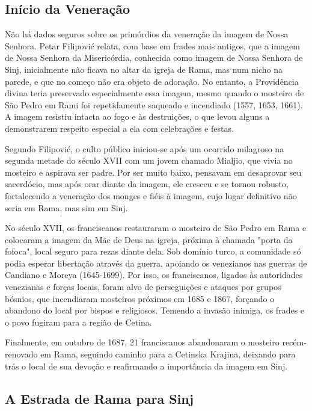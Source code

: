 \documentclass[a4paper,14pt]{extarticle} \usepackage[utf8]{inputenc}
\begin{document}
\subsection{Início da Veneração}

Não há dados seguros sobre os primórdios da veneração da imagem de Nossa Senhora. Petar Filipović relata, com base em frades mais antigos, que a imagem de Nossa Senhora da Misericórdia, conhecida como imagem de Nossa Senhora de Sinj, inicialmente não ficava no altar da igreja de Rama, mas num nicho na parede, e que no começo não era objeto de adoração. No entanto, a Providência divina teria preservado especialmente essa imagem, mesmo quando o mosteiro de São Pedro em Rami foi repetidamente saqueado e incendiado (1557, 1653, 1661). A imagem resistiu intacta ao fogo e às destruições, o que levou alguns a demonstrarem respeito especial a ela com celebrações e festas.

Segundo Filipović, o culto público iniciou-se após um ocorrido milagroso na segunda metade do século XVII com um jovem chamado Mialjio, que vivia no mosteiro e aspirava ser padre. Por ser muito baixo, pensavam em desaprovar seu sacerdócio, mas após orar diante da imagem, ele cresceu e se tornou robusto, fortalecendo a veneração dos monges e fiéis à imagem, cujo lugar definitivo não seria em Rama, mas sim em Sinj.

No século XVII, os franciscanos restauraram o mosteiro de São Pedro em Rama e colocaram a imagem da Mãe de Deus na igreja, próxima à chamada "porta da fofoca", local seguro para rezas diante dela. Sob domínio turco, a comunidade só podia esperar libertação através da guerra, apoiando os venezianos nas guerras de Candiano e Moreya (1645-1699). Por isso, os franciscanos, ligados às autoridades venezianas e forças locais, foram alvo de perseguições e ataques por grupos bósnios, que incendiaram mosteiros próximos em 1685 e 1867, forçando o abandono do local por bispos e religiosos. Temendo a invasão inimiga, os frades e o povo fugiram para a região de Cetina.

Finalmente, em outubro de 1687, 21 franciscanos abandonaram o mosteiro recém-renovado em Rama, seguindo caminho para a Cetinska Krajina, deixando para trás o local de sua devoção e reafirmando a importância da imagem em Sinj.

\subsection{A Estrada de Rama para Sinj}
\end{document}

